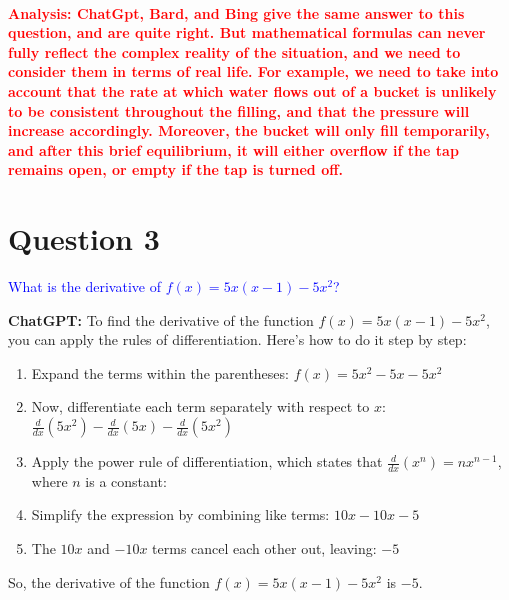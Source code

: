 \documentclass[11pt]{article} %
\begin{document}
\paragraph{\textcolor{red}{Analysis: ChatGpt, Bard, and Bing give the same answer to this question, and are quite right. But mathematical formulas can never fully reflect the complex reality of the situation, and we need to consider them in terms of real life. For example, we need to take into account that the rate at which water flows out of a bucket is unlikely to be consistent throughout the filling, and that the pressure will increase accordingly. Moreover, the bucket will only fill temporarily, and after this brief equilibrium, it will either overflow if the tap remains open, or empty if the tap is turned off.
    }}

\section{Question 3}
\textcolor{blue}{What is the derivative of $f(x) = 5x(x-1) - 5x^2$?}

\begin{mdframed}[
        backgroundcolor=white,  %
        linecolor=black,        %
        leftmargin=5pt,         %
        rightmargin=5pt,        %
        linewidth=2pt           %
    ]
    \textbf{ChatGPT: } To find the derivative of the function \(f(x) = 5x(x-1) - 5x^2\), you can apply the rules of differentiation. Here's how to do it step by step:

    \begin{enumerate}
        \item Expand the terms within the parentheses: \(f(x) = 5x^2 - 5x - 5x^2\)
        \item Now, differentiate each term separately with respect to \(x\): \\ \(\frac{d}{dx}(5x^2) - \frac{d}{dx}(5x) - \frac{d}{dx}(5x^2)\)
        \item Apply the power rule of differentiation, which states that \(\frac{d}{dx}(x^n) = n x^{n-1}\), where \(n\) is a constant:
        \item Simplify the expression by combining like terms: \(10x - 10x - 5\)
        \item The \(10x\) and \(-10x\) terms cancel each other out, leaving: \(-5\)
    \end{enumerate}
    So, the derivative of the function \(f(x) = 5x(x-1) - 5x^2\) is \(-5\).
\end{mdframed}
\end{document}
